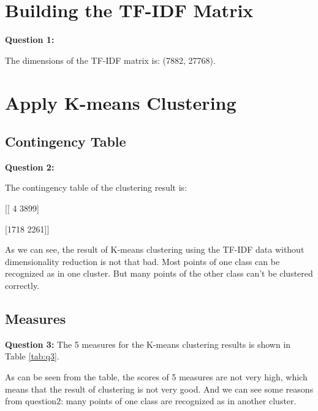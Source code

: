 \documentclass[runningheads]{llncs}
\begin{document}
\section{Building the TF-IDF Matrix}

\textbf{Question 1:}

The dimensions of the TF-IDF matrix is: (7882, 27768).

\section{Apply K-means Clustering}

\subsection{Contingency Table}

\textbf{Question 2:}

The contingency table of the clustering result is:
\begin{center}
[[   4 3899]

 [1718 2261]]
\end{center}

As we can see, the result of K-means clustering using the TF-IDF data without dimensionality reduction is not that bad. Most points of one class can be recognized as in one cluster. But many points of the other class can't be clustered correctly.

\subsection{Measures}

\textbf{Question 3:}
The 5 measures for the K-means clustering results is shown in Table \ref{tab:q3}.

\begin{table}[h]
\center
\caption{5 measures for the K-means clustering results}
\label{tab:q3}
\end{table}

As can be seen from the table, the scores of 5 measures are not very high, which means that the result of clustering is not very good. And we can see some reasons from question2: many points of one class are recognized as in another cluster.
\end{document}
